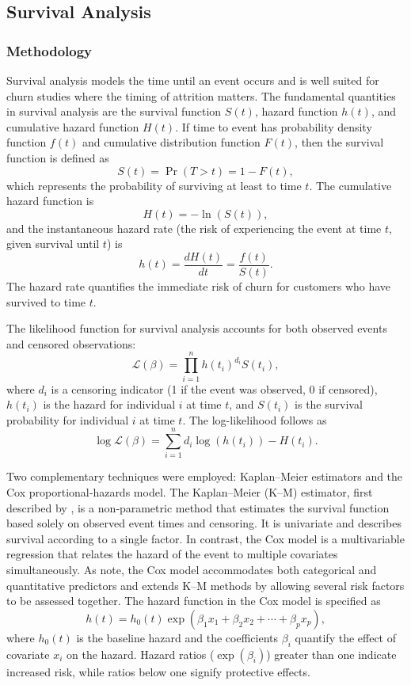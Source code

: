\documentclass[12pt]{article}
\begin{document}
\subsection{Survival Analysis}
\subsubsection{Methodology}
Survival analysis models the time until an event occurs and is well suited for churn studies where the timing of attrition matters.  The fundamental quantities in survival analysis are the survival function \(S(t)\), hazard function \(h(t)\), and cumulative hazard function \(H(t)\).  If time to event has probability density function \(f(t)\) and cumulative distribution function \(F(t)\), then the survival function is defined as
\[ S(t) = \Pr(T > t) = 1 - F(t), \]
which represents the probability of surviving at least to time \(t\).  The cumulative hazard function is
\[ H(t) = -\ln(S(t)), \]
and the instantaneous hazard rate (the risk of experiencing the event at time \(t\), given survival until \(t\)) is
\[ h(t) = \frac{dH(t)}{dt} = \frac{f(t)}{S(t)}. \]
The hazard rate quantifies the immediate risk of churn for customers who have survived to time \(t\).

The likelihood function for survival analysis accounts for both observed events and censored observations:
\[ \mathcal{L}(\beta) = \prod_{i=1}^{n} h(t_{i})^{d_{i}} S(t_{i}), \]
where \(d_i\) is a censoring indicator (1 if the event was observed, 0 if censored), \(h(t_i)\) is the hazard for individual \(i\) at time \(t\), and \(S(t_i)\) is the survival probability for individual \(i\) at time \(t\).  The log-likelihood follows as
\[ \log\mathcal{L}(\beta) = \sum_{i=1}^n d_i \log(h(t_i)) - H(t_i). \]

Two complementary techniques were employed: Kaplan–Meier estimators and the Cox proportional‑hazards model.  The Kaplan–Meier (K–M) estimator, first described by \citet{dudley2016kaplan}, is a non‑parametric method that estimates the survival function based solely on observed event times and censoring.  It is univariate and describes survival according to a single factor.  In contrast, the Cox model is a multivariable regression that relates the hazard of the event to multiple covariates simultaneously.  As \citet{sthda_cox} note, the Cox model accommodates both categorical and quantitative predictors and extends K–M methods by allowing several risk factors to be assessed together.  The hazard function in the Cox model is specified as
\[ h(t) = h_0(t) \exp(\beta_1 x_1 + \beta_2 x_2 + \cdots + \beta_p x_p), \]
where \(h_0(t)\) is the baseline hazard and the coefficients \(\beta_i\) quantify the effect of covariate \(x_i\) on the hazard.  Hazard ratios (\(\exp(\beta_i)\)) greater than one indicate increased risk, while ratios below one signify protective effects.
\end{document}
